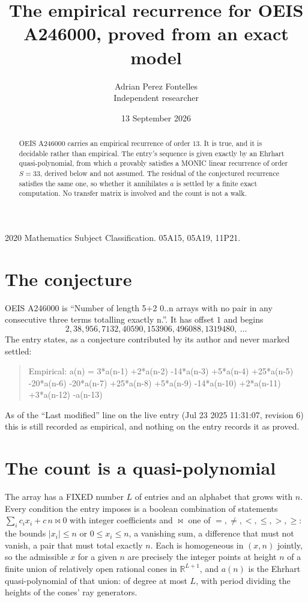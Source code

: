 \documentclass[11pt,a4paper]{article}
\title{The empirical recurrence for OEIS A246000, proved from an exact model}
\author{Adrian Perez Fontelles\\ \small Independent researcher}
\date{13 September 2026}
\theoremstyle{plain}
\theoremstyle{definition}
\begin{document}
\maketitle

\begin{abstract}
OEIS A246000 carries an empirical recurrence of order $13$. It is true, and it is
decidable rather than empirical. The entry's sequence is given exactly by an Ehrhart quasi-polynomial, from
which $a$ provably satisfies a MONIC linear recurrence of order $S=33$, derived below and not
assumed. The residual of the conjectured recurrence satisfies the same one, so whether it
annihilates $a$ is settled by a finite exact computation. No transfer matrix is involved and
the count is not a walk.
\end{abstract}

\noindent\small 2020 Mathematics Subject Classification. 05A15, 05A19, 11P21.\normalsize

\section{The conjecture}

OEIS A246000 is ``Number of length 5+2 0..n arrays with no pair in any consecutive three terms totalling exactly n.''. It has offset $1$ and begins
\[
2, 38, 956, 7132, 40590, 153906, 496088, 1319480,\ \dots
\]
The entry states, as a conjecture contributed by its author and never marked settled:
\begin{quote}
Empirical: a(n) = 3*a(n-1) +2*a(n-2) -14*a(n-3) +5*a(n-4) +25*a(n-5) -20*a(n-6) -20*a(n-7) +25*a(n-8) +5*a(n-9) -14*a(n-10) +2*a(n-11) +3*a(n-12) -a(n-13)
\end{quote}
As of the ``Last modified'' line on the live entry (Jul 23 2025 11:31:07, revision 6)
this is still recorded as empirical, and nothing on the entry records it as proved.

\section{The count is a quasi-polynomial}

The array has a FIXED number $L$ of entries and an alphabet that grows with $n$. Every
condition the entry imposes is a boolean combination of statements
$\sum_i c_ix_i + c\,n \bowtie 0$ with integer coefficients and $\bowtie$ one of
$=,\ne,<,\le,>,\ge$: the bounds $|x_i|\le n$ or $0\le x_i\le n$, a vanishing sum, a difference
that must not vanish, a pair that must total exactly $n$. Each is homogeneous in $(x,n)$
jointly, so the admissible $x$ for a given $n$ are precisely the integer points at height $n$
of a finite union of relatively open rational cones in $\mathbb{R}^{L+1}$, and $a(n)$ is
the Ehrhart quasi-polynomial of that union: of degree at most $L$, with period dividing the
heights of the cones' ray generators.
\end{document}
